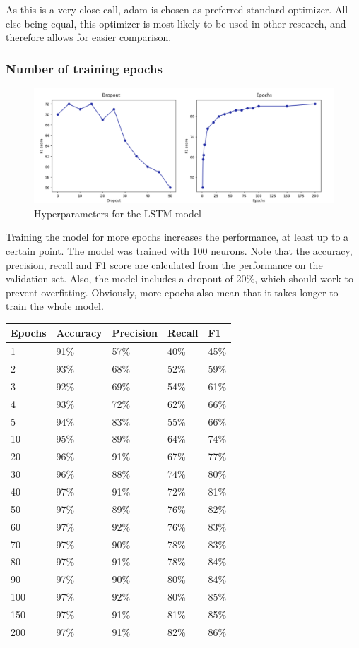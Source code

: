 \documentclass[
a4paper,
pagesize,
pdftex,
12pt,
twoside, %
BCOR=5mm, %
ngerman,
fleqn,
final,
]{scrartcl}
\begin{document}
	As this is a very close call, adam is chosen as preferred standard optimizer. All else being equal, this optimizer is most likely to be used in other research, and therefore allows for easier comparison.
	
	\subsubsection{Number of training epochs}
			\begin{figure}[h]
		\centering
		\includegraphics[width=1\textwidth]{img/hyper2}
		\caption{Hyperparameters for the LSTM model}
		\label{fig:hyper2}
	\end{figure}
	
	Training the model for more epochs increases the performance, at least up to a certain point. The model was trained with 100 neurons. Note that the accuracy, precision, recall and F1 score are calculated from the performance on the validation set. Also, the model includes a dropout of 20\%, which should work to prevent overfitting. Obviously, more epochs also mean that it takes longer to train the whole model.
	
	\begin{tabular}{ | p{2cm} || p{2cm}|p{2cm}|p{2cm}|p{2cm}|  }
		\hline
		Epochs & Accuracy & Precision & Recall & F1 \\
		\hline
		1 & 91\% &  57\% &  40\% &  45\% \\
		2 & 93\% &  68\% &  52\% &  59\% \\
		3 &  92\%&  69\%&   54\%&  61\% \\
		4 &  93\%&  72\%&   62\%&  66\% \\
		5 &  94\%&  83\%&   55\%&  66\% \\
		10 &  95\%&  89\%&   64\%&  74\% \\
		20 &  96\%&  91\%&   67\%&  77\% \\
		30 &  96\%&  88\%&   74\%&  80\% \\
		40 &  97\%&  91\%&   72\%&  81\% \\
		50 &  97\%&  89\%&   76\%&  82\% \\
		60 &  97\%&  92\%&   76\%&  83\% \\
		70 &  97\%&  90\%&   78\%&  83\% \\
		80 &  97\%&  91\%&   78\%&  84\% \\
		90 &  97\%&  90\%&   80\%&  84\% \\
		100 &  97\%&  92\%&   80\%&  85\% \\
		150 &  97\%&  91\%&   81\%&  85\% \\
		200 &  97\%&  91\%&   82\%&  86\% \\
		\hline
		\hline
	\end{tabular}
	
\end{document}
